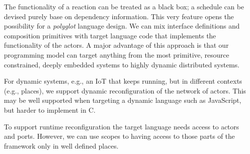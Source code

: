 \documentclass[sigconf]{acmart}
\begin{document}
The functionality of a reaction can be treated as a black box; a schedule can be devised purely base on dependency information. This very feature opens the possibility for a \emph{polyglot} language design. We can mix interface definitions and composition primitives with target language code that implements the functionality of the actors. A major advantage of this approach is that our programming model can target anything from the most primitive, resource constrained, deeply embedded systems to highly dynamic distributed systems. 


For dynamic systems, e.g., an IoT that keeps running, but in different contexts
(e.g., places), we support dynamic reconfiguration of the network of actors.
This may be well supported when targeting a dynamic language such as JavaScript,
but harder to implement in C.

To support runtime reconfiguration the target language needs access to actors and
ports. However, we can use scopes to having access to those parts of the framework
only in well defined places.










\end{document}
